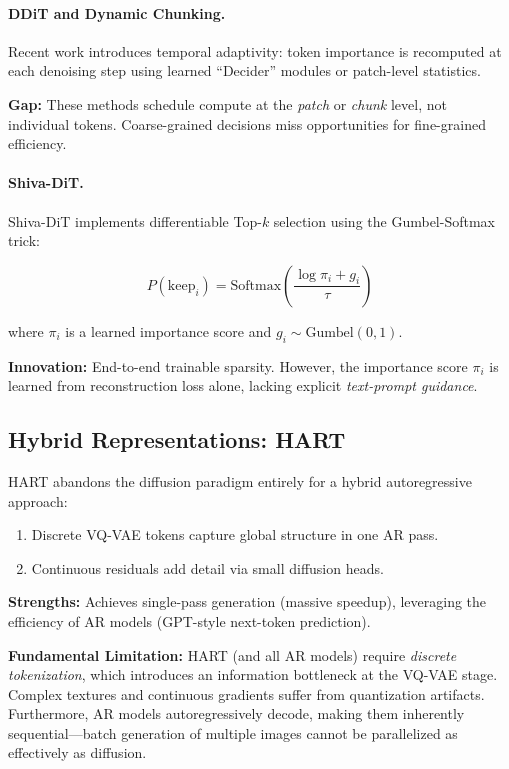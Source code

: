\documentclass{article}
\begin{document}
\paragraph{DDiT and Dynamic Chunking.}
Recent work \cite{kim2026ddit, haridas2026dynamic} introduces temporal
adaptivity: token importance is recomputed at each denoising step using
learned ``Decider'' modules or patch-level statistics.

\textbf{Gap:} These methods schedule compute at the \textit{patch} or
\textit{chunk} level, not individual tokens. Coarse-grained decisions
miss opportunities for fine-grained efficiency.

\paragraph{Shiva-DiT.}
Shiva-DiT \cite{zhang2026shiva} implements differentiable Top-$k$ selection
using the Gumbel-Softmax trick:

$$
    P(\text{keep}_i) = \text{Softmax}\left(\frac{\log \pi_i + g_i}{\tau}\right)
$$

where $\pi_i$ is a learned importance score and $g_i \sim \text{Gumbel}(0,1)$.

\textbf{Innovation:} End-to-end trainable sparsity. However, the importance
score $\pi_i$ is learned from reconstruction loss alone, lacking explicit
\textit{text-prompt guidance}.

\subsection{Hybrid Representations: HART}

HART \cite{tang2024hart} abandons the diffusion paradigm entirely for a
hybrid autoregressive approach:

\begin{enumerate}
    \item Discrete VQ-VAE tokens capture global structure in one AR pass.
    \item Continuous residuals add detail via small diffusion heads.
\end{enumerate}

\textbf{Strengths:} Achieves single-pass generation (massive speedup),
leveraging the efficiency of AR models (GPT-style next-token prediction).

\textbf{Fundamental Limitation:} HART (and all AR models) require
\textit{discrete tokenization}, which introduces an information bottleneck
at the VQ-VAE stage. Complex textures and continuous gradients suffer from
quantization artifacts. Furthermore, AR models autoregressively decode,
making them inherently sequential—batch generation of multiple images
cannot be parallelized as effectively as diffusion.
\end{document}

